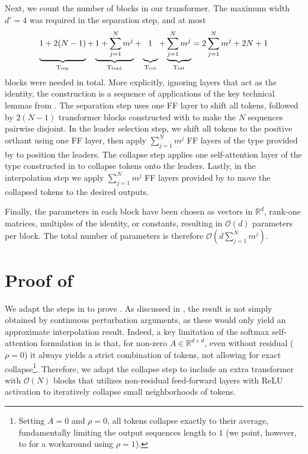 \documentclass[pdflatex,sn-mathphys-num]{sn-jnl}%
\theoremstyle{thmstyleone}%
\theoremstyle{thmstyletwo}%
\theoremstyle{thmstylethree}%
\numberwithin{equation}{section}
\newcommand{\R}{\mathbb{R}}
\DeclareMathOperator{\T}{\mathrm{T}}
\begin{document}
Next, we count the number of blocks in our transformer. The maximum width $d' = 4$ was required in the separation step, and at most 
$$
\underbrace{1 + 2(N-1)\vphantom{\sum_{j=1}^N}}_{\T_\text{sep}}
+ \underbrace{1 + \sum_{j=1}^N m^j}_{\T_\text{lead}}
+ \underbrace{1\vphantom{\sum_{j=1}^N}}_{\T_\text{col}}
+ \underbrace{\sum_{j=1}^N m^j}_{\T_\text{int}}
= 2\sum_{j=1}^N m^j + 2N + 1
$$
blocks were needed in total. 
More explicitly, ignoring layers that act as the identity, the construction is a sequence of applications of the key technical lemmas from . 
The separation step uses one FF layer to shift all tokens, followed by $2(N-1)$ transformer blocks constructed with  to make the $N$ sequences pairwise disjoint. 
In the leader selection step, we shift all tokens to the positive orthant using one FF layer, then apply $\sum_{j=1}^N m^j$ FF layers of the type provided by  to position the leaders. 
The collapse step applies one self-attention layer of the type constructed in  to collapse tokens onto the leaders. 
Lastly, in the interpolation step we apply $\sum_{j=1}^N m^j$ FF layers provided by  to move the collapsed tokens to the desired outputs.

Finally, the parameters in each block have been chosen as vectors in $\R^d$, rank-one matrices, multiples of the identity, or constants, resulting in $\mathcal{O}(d)$ parameters per block. The total number of parameters is therefore $\mathcal{O}(d \sum_{j=1}^N m^j)$.

\section{Proof of \texorpdfstring{}{Theorem \ref{thm:mainResultSoftmax}}}\label{sec:proofOfMainResultSoftmax}

We adapt the steps in  to prove . As discussed in , the result is not simply obtained by continuous perturbation arguments, as these would only yield an approximate interpolation result. Indeed, a key limitation of the softmax self-attention formulation in  is that, for non-zero $A\in \R^{d\times d}$, even without residual ($\rho = 0$) it always yields a strict combination of tokens, not allowing for exact collapse\footnote{Setting $A = 0$ and $\rho = 0$, all tokens collapse exactly to their average, fundamentally limiting the output sequences length to $1$ (we point, however, to \cite{geshkovski2024measure} for a workaround using $\rho = 1$).}. Therefore, we adapt the collapse step to include an extra transformer with $\mathcal{O}(N)$ blocks that utilizes non-residual feed-forward layers with ReLU activation to iteratively collapse small neighborhoods of tokens.
\end{document}
